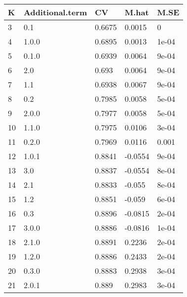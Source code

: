 \begin{table}[ht]
\centering
\begin{tabular}{lllll}
  \hline
K & Additional.term & CV & M.hat & M.SE \\ 
  \hline
3 & 0.1 & 0.6675 & 0.0015 & 0 \\ 
  4 & 1.0.0 & 0.6895 & 0.0013 & 1e-04 \\ 
  5 & 0.1.0 & 0.6939 & 0.0064 & 9e-04 \\ 
  6 & 2.0 & 0.693 & 0.0064 & 9e-04 \\ 
  7 & 1.1 & 0.6938 & 0.0067 & 9e-04 \\ 
  8 & 0.2 & 0.7985 & 0.0058 & 5e-04 \\ 
  9 & 2.0.0 & 0.7977 & 0.0058 & 5e-04 \\ 
  10 & 1.1.0 & 0.7975 & 0.0106 & 3e-04 \\ 
  11 & 0.2.0 & 0.7969 & 0.0116 & 0.001 \\ 
  12 & 1.0.1 & 0.8841 & -0.0554 & 9e-04 \\ 
  13 & 3.0 & 0.8837 & -0.0554 & 8e-04 \\ 
  14 & 2.1 & 0.8833 & -0.055 & 8e-04 \\ 
  15 & 1.2 & 0.8851 & -0.059 & 6e-04 \\ 
  16 & 0.3 & 0.8896 & -0.0815 & 2e-04 \\ 
  17 & 3.0.0 & 0.8886 & -0.0816 & 1e-04 \\ 
  18 & 2.1.0 & 0.8891 & 0.2236 & 2e-04 \\ 
  19 & 1.2.0 & 0.8886 & 0.2433 & 2e-04 \\ 
  20 & 0.3.0 & 0.8883 & 0.2938 & 3e-04 \\ 
  21 & 2.0.1 & 0.889 & 0.2983 & 3e-04 \\ 
   \hline
\end{tabular}
\end{table}
